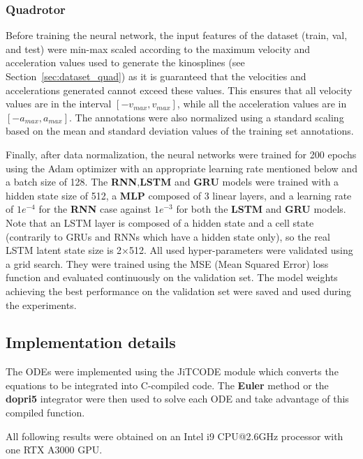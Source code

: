 \subsubsection{Quadrotor}\label{sec:train_quad}

Before training the neural network, the input features of the dataset (train, val, and test) were min-max scaled according to the maximum velocity and acceleration values used to generate the kinosplines (see Section~\ref{sec:dataset_quad}) as it is guaranteed that the velocities and accelerations generated cannot exceed these values. 
This ensures that all velocity values are in the interval $[-v_{max}, v_{max}]$, while all the acceleration values are in $[-a_{max}, a_{max}]$. 
The annotations were also normalized using a standard scaling based on the mean and standard deviation values of the training set annotations.

Finally, after data normalization, the neural networks were trained for 200 epochs using the Adam optimizer \cite{kingma2014adam} with an appropriate learning rate mentioned below and a batch size of 128. 
The \textbf{RNN},\textbf{LSTM} and \textbf{GRU} models were trained with a hidden state size of 512, a \textbf{MLP} composed of 3 linear layers, and a learning rate of $1e^{-4}$ for the \textbf{RNN} case against $1e^{-3}$ for both the \textbf{LSTM} and \textbf{GRU} models.
Note that an LSTM layer is composed of a hidden state and a cell state (contrarily to GRUs and RNNs which have a hidden state only), so the real LSTM latent state size is 2$\times$512.
All used hyper-parameters were validated using a grid search.
They were trained using the MSE (Mean Squared Error) loss function and evaluated continuously on the validation set. 
The model weights achieving the best performance on the validation set were saved and used during the experiments.

\subsection{Implementation details}

The ODEs were implemented using the JiTCODE \cite{cJit} module which converts the equations to be integrated into C-compiled code.
The \textbf{Euler} method or the \textbf{dopri5} integrator were then used to solve each ODE and take advantage of this compiled function.

All following results were obtained on an Intel i9 CPU@2.6GHz processor with one RTX A3000 GPU. 


